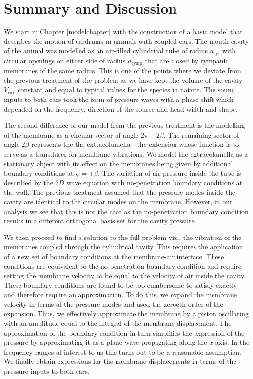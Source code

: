 \chapter{Summary and Discussion}
We start in Chapter \ref{modelchapter} with the construction of a basic model that describes the motion of eardrums in animals
with coupled ears. The mouth cavity of the animal was modelled as an air-filled cylindrical tube
of radius $a_{\mathrm{\mathrm{cyl}}}$ with circular openings on either side of radius $a_{\mathrm{tymp}}$ that are closed by
tympanic membranes of the same radius. This is one of the points where we deviate from the previous treatment \cite{vossenjasa} 
of the problem as we have kept the volume of the cavity $V_{\mathrm{cav}}$ constant and equal to
typical values for the species in nature. The sound inputs to both ears took the form of pressure waves
with a phase shift which depended on the frequency, direction of the source and head width and shape.

The second difference of our model from the previous treatment is the modelling of the membrane
as a circular sector of angle $2\pi-2\beta$. The remaining sector of angle $2\beta$ represents the 
the extracolumella - the extension whose function is to serve as a transducer for
membrane vibrations. We model the extracolumella as a stationary object with its
effect on the membranes being given by additional boundary conditions at $\phi=\pm\beta$. The variation of air-pressure
inside the tube is described by the $3D$ wave equation with no-penetration boundary conditions at the wall. The previous
treatment assumed that the pressure modes inside the cavity are identical to the circular modes on the membrane. However,
in our analysis we see that this is not the case as the no-penetration boundary condition results in a different orthogonal basis set
for the cavity pressure.

We then proceed to find a solution to the full problem viz., the vibration of the membranes coupled through the cylindrical
cavity. This requires the application of a new set of boundary conditions at the membrane-air interface. These conditions are
equivalent to the no-penetration boundary condition and require setting the membrane velocity to be equal to the velocity of
air inside the cavity. These boundary conditions are found to be too cumbersome to satisfy exactly 
and therefore require an approximation. To do this, we expand the membrane 
velocity in terms of the pressure modes and used the zeroeth order of the expansion. Thus, we effectively approximate the membrane
by a piston oscillating with an amplitude equal to the integral of the membrane displacement. The approximation of the boundary
condition in turn simplifies the expression of the pressure by approximating it as a plane wave propagating along the $x$-axis. In the
frequency ranges of interest to us this turns out to be a reasonable assumption. We finally obtain expressions
for the membrane displacements in terms of the pressure inputs to both ears.

